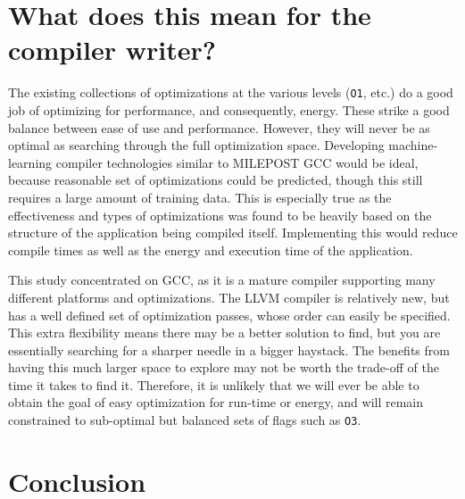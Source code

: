 \documentclass[twocolumn]{article}
\newcommand{\nsection}[1]{\section{\bfseries #1}}
\newcommand{\todo}[1]{\textbf{\textcolor{red}{#1}}}
\begin{document}



\nsection{What does this mean for the compiler writer?}

The existing collections of optimizations at the various levels (\texttt{O1}, etc.) do a good job of optimizing for performance, and consequently, energy. These strike a good balance between ease of use and performance. However, they will never be as optimal as searching through the full optimization space. Developing machine-learning compiler technologies similar to MILEPOST GCC would be ideal, because reasonable set of optimizations could be predicted, though this still requires a large amount of training data. This is especially true as the effectiveness and types of optimizations was found to be heavily based on the structure of the application being compiled itself. Implementing this would reduce compile times as well as the energy and execution time of the application.

This study concentrated on GCC, as it is a mature compiler supporting many different platforms and optimizations. The LLVM compiler is relatively new, but has a well defined set of optimization passes, whose order can easily be specified. This extra flexibility means there may be a better solution to find, but you are essentially searching for a sharper needle in a bigger haystack. The benefits from having this much larger space to explore may not be worth the trade-off of the time it takes to find it. Therefore, it is unlikely that we will ever be able to obtain the goal of easy optimization for run-time or energy, and will remain constrained to sub-optimal but balanced sets of flags such as \texttt{O3}.


\nsection{Conclusion}

\end{document}
